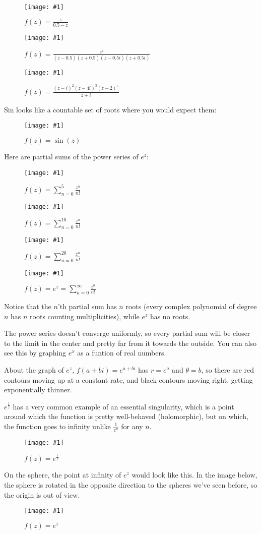 \documentclass[xhtml, mathjax]{article}
\newcommand{\singleimage}[2] {
  \begin{figure}
    \centering
    \texttt{[image: \#1]}\par
    #2
  \end{figure}
}
\begin{document}
    \singleimage{sphere_poly_1.gif}{$f(z)=\frac{z}{0.5-z}$}

    \singleimage{sphere_poly_3.gif}{$f(z)=\frac{z^4}{(z - 0.5)(z + 0.5)(z -
    0.5i)(z + 0.5i)}$}

    \singleimage{poly_6.gif}{$f(z)=\frac{(z-i)^2(z-4i)^3(z-2)^5}{z+i}$}

    Sin looks like a countable set of roots where you would expect them:

    \singleimage{sin.gif}{$f(z)=\sin(z)$}

    Here are partial sums of the power series of $e^z$:

    \singleimage{exp_sum_to_5.gif}{$f(z) = \sum_{n=0}^5 \frac{z^n}{n!}$}

    \singleimage{exp_sum_to_10.gif}{$f(z) = \sum_{n=0}^{10} \frac{z^n}{n!}$}

    \singleimage{exp_sum_to_20.gif}{$f(z) = \sum_{n=0}^{20} \frac{z^n}{n!}$}

    \singleimage{exp.gif}{$f(z) = e^z = \sum_{n=0}^\infty \frac{z^n}{n!}$}

    Notice that the $n$'th partial sum has $n$ roots (every complex polynomial
    of degree $n$ has $n$ roots counting multiplicities), while $e^z$ has no
    roots.

    The power series doesn't converge uniformly, so every partial sum will be
    closer to the limit in the center and pretty far from it towards the
    outside. You can also see this by graphing $e^x$ as a funtion of real
    numbers.

    About the graph of $e^z$, $f(a+bi) = e^{a+bi}$ has $r = e^a$ and
    $\theta = b$, so there are red contours moving up at a constant rate, and
    black contours moving right, getting exponentially thinner.

    $e^{\frac{1}{z}}$ has a very common example of an essential singularity,
    which is a point around which the function is pretty well-behaved
    (holomorphic), but on which, the function goes to infinity unlike
    $\frac{1}{z^n}$ for any $n$.

    \singleimage{exp_inv.gif}{$f(z)=e^{\frac{1}{z}}$}

    On the sphere, the point at infinity of $e^z$ would look like this. In the
    image below, the sphere is rotated in the opposite direction to the spheres
    we've seen before, so the origin is out of view.

    \singleimage{exp_inv_sphere.gif}{$f(z)=e^{z}$}

\end{document}
